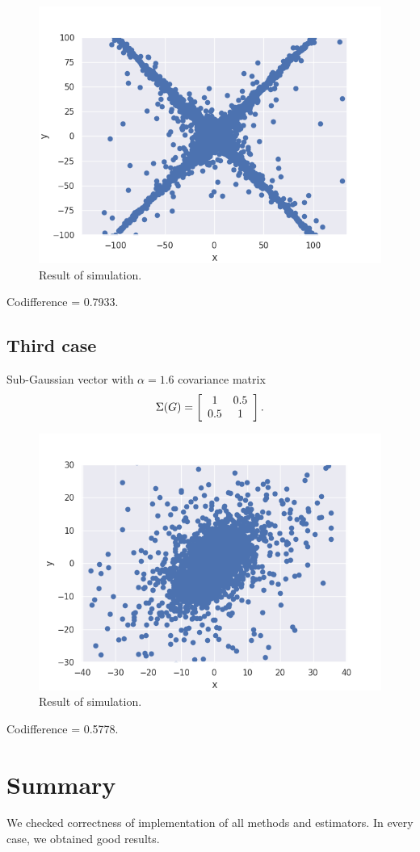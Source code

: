 \documentclass{article}
\begin{document}
	\begin{figure}[H]
		\centering
		\includegraphics[width=1\linewidth]{images/ex_5_2_alpha_stable_vector_simulation_discreet_scatter}
		\caption{Result of simulation.}\label{14}
	\end{figure}
	
	Codifference = 0.7933.
	
	\subsection{Third case}
	Sub-Gaussian vector with $\alpha =1.6$ covariance matrix
	\begin{equation*}
		\Sigma(G) = \left[{\begin{array}{*{20}c}
			1 & 0.5\\
			0.5 & 1\end{array} } \right].
	\end{equation*}
	
	\begin{figure}[H]
		\centering
		\includegraphics[width=1\linewidth]{images/ex_5_3_alpha_stable_vector_simulation_continuous_scatter}
		\caption{Result of simulation.}\label{15}
	\end{figure}
	
	Codifference = 0.5778.
	
	
	
	\section{Summary}
	We checked correctness of implementation of all methods and estimators. In every case, we obtained good results.
	
\end{document}
